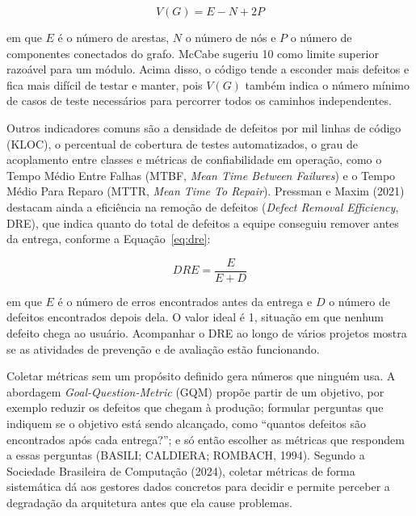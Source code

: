 \documentclass[12pt,a4paper]{article}
\begin{document}
\begin{equation}
V(G) = E - N + 2P
\label{eq:mccabe}
\end{equation}

\noindent em que $E$ é o número de arestas, $N$ o número de nós e $P$ o número de componentes conectados do grafo. McCabe sugeriu 10 como limite superior razoável para um módulo. Acima disso, o código tende a esconder mais defeitos e fica mais difícil de testar e manter, pois $V(G)$ também indica o número mínimo de casos de teste necessários para percorrer todos os caminhos independentes.

Outros indicadores comuns são a densidade de defeitos por mil linhas de código (KLOC), o percentual de cobertura de testes automatizados, o grau de acoplamento entre classes e métricas de confiabilidade em operação, como o Tempo Médio Entre Falhas (MTBF, \textit{Mean Time Between Failures}) e o Tempo Médio Para Reparo (MTTR, \textit{Mean Time To Repair}). Pressman e Maxim (2021) destacam ainda a eficiência na remoção de defeitos (\textit{Defect Removal Efficiency}, DRE), que indica quanto do total de defeitos a equipe conseguiu remover antes da entrega, conforme a Equação~\eqref{eq:dre}:

\begin{equation}
DRE = \frac{E}{E + D}
\label{eq:dre}
\end{equation}

\noindent em que $E$ é o número de erros encontrados antes da entrega e $D$ o número de defeitos encontrados depois dela. O valor ideal é 1, situação em que nenhum defeito chega ao usuário. Acompanhar o DRE ao longo de vários projetos mostra se as atividades de prevenção e de avaliação estão funcionando.

Coletar métricas sem um propósito definido gera números que ninguém usa. A abordagem \textit{Goal-Question-Metric} (GQM) propõe partir de um objetivo, por exemplo reduzir os defeitos que chegam à produção; formular perguntas que indiquem se o objetivo está sendo alcançado, como ``quantos defeitos são encontrados após cada entrega?''; e só então escolher as métricas que respondem a essas perguntas (BASILI; CALDIERA; ROMBACH, 1994). Segundo a Sociedade Brasileira de Computação (2024), coletar métricas de forma sistemática dá aos gestores dados concretos para decidir e permite perceber a degradação da arquitetura antes que ela cause problemas.

\end{document}
